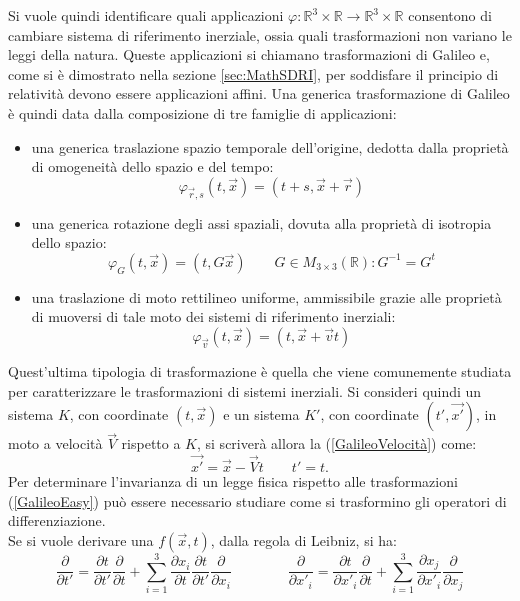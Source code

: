 Si vuole quindi identificare quali applicazioni $\varphi:\mathbb{R}^3\times\mathbb{R}\rightarrow
\mathbb{R}^3\times\mathbb{R}$ consentono di cambiare sistema di riferimento inerziale, ossia quali 
trasformazioni non variano le leggi della natura. Queste applicazioni si chiamano trasformazioni di 
Galileo e, come si è dimostrato nella sezione \ref{sec:MathSDRI}, per soddisfare il principio di relatività devono essere applicazioni affini.
Una generica trasformazione di Galileo è quindi data dalla composizione di tre famiglie di applicazioni:
\begin{itemize}
	\item una generica traslazione spazio temporale dell'origine, dedotta dalla proprietà 
	di omogeneità dello spazio e del tempo:
	\begin{equation}
		\varphi_{\vec{r},s}(t,\vec{x})=(t+s,\vec{x}+\vec{r})
		\label{GalileoTraslazoine}
	\end{equation} 
\item una generica rotazione degli assi spaziali, dovuta alla proprietà di isotropia dello spazio:
\begin{equation}
	\varphi_{G}(t,\vec{x})=(t,G\vec{x}) \qquad G\in M_{3\times3}(\mathbb{R}):G^{-1}=G^t
	\label{GalileoRotazione}
\end{equation} 
	\item una traslazione di moto rettilineo uniforme, ammissibile grazie alle proprietà di muoversi di tale moto dei sistemi 
	di riferimento inerziali:
\begin{equation}
	\varphi_{\vec{v}}(t,\vec{x})=(t,\vec{x}+\vec{v}t)
	\label{GalileoVelocità}
\end{equation} 
\end{itemize}
Quest'ultima tipologia di trasformazione è quella che viene comunemente studiata per caratterizzare le trasformazioni di sistemi inerziali. 
Si consideri quindi un sistema $K$, con coordinate $(t,\vec{x})$ e un sistema $K'$, con 
coordinate $(t',\vec{x'})$, in moto a velocità $\vec{V}$ rispetto a $K$, si scriverà allora la 
(\ref{GalileoVelocità}) come:
\begin{equation}
	\vec{x'}=\vec{x}-\vec{V}t \qquad t'=t.
	\label{GalileoEasy}
\end{equation}
Per determinare l'invarianza di un legge fisica rispetto alle trasformazioni (\ref{GalileoEasy}) può essere necessario 
studiare come si trasformino gli operatori di differenziazione.\\
Se si vuole derivare una $f(\vec{x},t)$, dalla regola di Leibniz, si ha:
\begin{equation*}
		\frac{\partial}{\partial t'}=\frac{\partial t}{\partial t'}\frac{\partial}{\partial t}+
		\sum_{i=1}^{3}\frac{\partial x_i}{\partial t}\frac{\partial t}{\partial t'}
		\frac{\partial}{\partial x_i} \qquad \qquad
		\frac{\partial}{\partial x'_i}=\frac{\partial t}{\partial x'_i}\frac{\partial}{\partial t}+
		\sum_{i=1}^{3}\frac{\partial x_j}{\partial x'_i}\frac{\partial}{\partial x_j}
\end{equation*}
